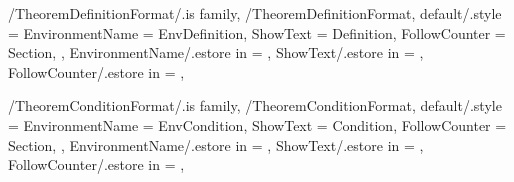 \newcommand{\InitTheoremTheoremFormat}
{%
  \theoremstyle{plain}%
  \ifthenelse{\equal{\GetTheoremTheoremFormatFollowCounter}{\empty}}%
  {%
    \newtheorem{%
      \GetTheoremTheoremFormatEnvironmentName}{%
      \GetTheoremTheoremFormatShowText}%
  }%
  {%
    \MappingTheoremCounter[Theorem]{\GetTheoremTheoremFormatFollowCounter}%
    \newtheorem{%
      \GetTheoremTheoremFormatEnvironmentName}{%
      \GetTheoremTheoremFormatShowText}[section]%
  }%
} %


\pgfkeys
{
  /TheoremDefinitionFormat/.is family, /TheoremDefinitionFormat,
  default/.style =
  {
    EnvironmentName = {EnvDefinition},
    ShowText = {Definition},
    FollowCounter = Section,
  },
  EnvironmentName/.estore in = \GetTheoremDefinitionFormatEnvironmentName,
  ShowText/.estore in = \GetTheoremDefinitionFormatShowText,
  FollowCounter/.estore in = \GetTheoremDefinitionFormatFollowCounter,
} %

\newcommand{\InsertDefinition}[2][\empty]
{%
  \InsertTheoremContent[#1]{\GetTheoremDefinitionFormatEnvironmentName}{#2}%
} %

\newcommand{\InitTheoremDefinitionFormat}
{%
  \theoremstyle{definition}%
  \ifthenelse{\equal{\GetTheoremDefinitionFormatFollowCounter}{\empty}}%
  {%
    \newtheorem{%
      \GetTheoremDefinitionFormatEnvironmentName}{%
      \GetTheoremDefinitionFormatShowText}%
  }%
  {%
    \MappingTheoremCounter[Definition]{\GetTheoremDefinitionFormatFollowCounter}%
    \newtheorem{%
      \GetTheoremDefinitionFormatEnvironmentName}{%
      \GetTheoremDefinitionFormatShowText}[%
      \GetTheoremDefinitionFormatFollowCounter]%
  }%
} %


\pgfkeys
{
  /TheoremConditionFormat/.is family, /TheoremConditionFormat,
  default/.style =
  {
    EnvironmentName = {EnvCondition},
    ShowText = {Condition},
    FollowCounter = Section,
  },
  EnvironmentName/.estore in = \GetTheoremConditionFormatEnvironmentName,
  ShowText/.estore in = \GetTheoremConditionFormatShowText,
  FollowCounter/.estore in = \GetTheoremConditionFormatFollowCounter,
} %

\newcommand{\InsertCondition}[2][\empty]
{%
  \InsertTheoremContent[#1]{\GetTheoremConditionFormatEnvironmentName}{#2}%
} %

